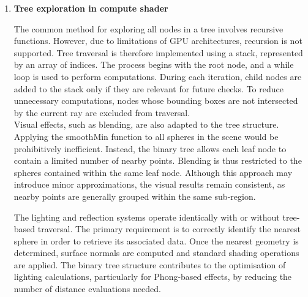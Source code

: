 \documentclass{rapportcs}
\begin{document}
\begin{enumerate}
       \item \textbf{Tree exploration in compute shader}
        
        The common method for exploring all nodes in a tree involves recursive functions. However, due to limitations of GPU architectures, recursion is not supported. Tree traversal is therefore implemented using a stack, represented by an array of indices. The process begins with the root node, and a while loop is used to perform computations. During each iteration, child nodes are added to the stack only if they are relevant for future checks. To reduce unnecessary computations, nodes whose bounding boxes are not intersected by the current ray are excluded from traversal.\\


        \noindent Visual effects, such as blending, are also adapted to the tree structure. Applying the smoothMin function to all spheres in the scene would be prohibitively inefficient. Instead, the binary tree allows each leaf node to contain a limited number of nearby points. Blending is thus restricted to the spheres contained within the same leaf node. Although this approach may introduce minor approximations, the visual results remain consistent, as nearby points are generally grouped within the same sub-region.\\


        \newpage

        \noindent The lighting and reflection systems operate identically with or without tree-based traversal. The primary requirement is to correctly identify the nearest sphere in order to retrieve its associated data. Once the nearest geometry is determined, surface normals are computed and standard shading operations are applied. The binary tree structure contributes to the optimisation of lighting calculations, particularly for Phong-based effects, by reducing the number of distance evaluations needed.


        

\end{enumerate}
\end{document}
